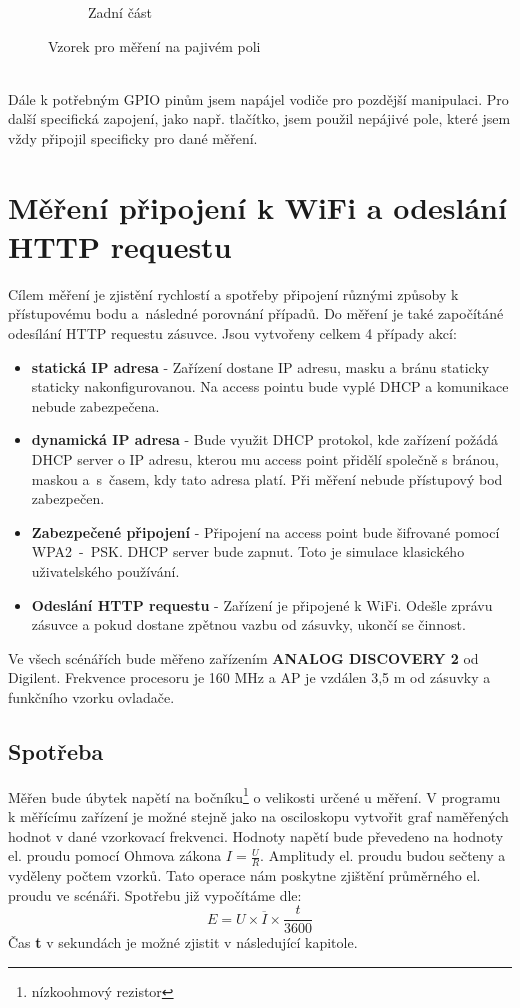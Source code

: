 \documentclass[a4paper, 12pt]{report}
\begin{document}
\begin{figure}[h!]
\begin{subfigure}[b]{0.4\linewidth}
            \caption{Zadní část}
        \end{subfigure}
        \caption{Vzorek pro měření na pajivém poli}
        \label{fig:zapojeni_esp32_vzorek}
    \end{figure}\\
    Dále k potřebným GPIO pinům jsem napájel vodiče pro pozdější manipulaci. Pro další specifická zapojení, jako např. tlačítko, jsem použil nepájivé pole, které jsem vždy připojil specificky pro dané měření.\\


    \section{Měření připojení k WiFi a odeslání HTTP requestu}
    \label{sec:wifi}
    Cílem měření je zjistění rychlostí a spotřeby připojení různými způsoby k přístupovému bodu a~následné porovnání případů. Do měření je také započítáné odesílání HTTP requestu zásuvce. Jsou vytvořeny celkem 4 případy akcí:
    \begin{itemize}
        \item \textbf{statická IP adresa} - Zařízení dostane IP adresu, masku a bránu staticky staticky nakonfigurovanou. Na access pointu bude vyplé DHCP a komunikace nebude zabezpečena.
        \item \textbf{dynamická IP adresa} - Bude využit DHCP protokol, kde zařízení požádá DHCP server o IP adresu, kterou mu access point přidělí společně s bránou, maskou a~s~časem, kdy tato adresa platí. Při měření nebude přístupový bod zabezpečen.
        \item \textbf{Zabezpečené připojení} - Připojení na access point bude šifrované pomocí WPA2~-~PSK. DHCP server bude zapnut. Toto je simulace klasického uživatelského používání.
        \item \textbf{Odeslání HTTP requestu} - Zařízení je připojené k WiFi. Odešle zprávu zásuvce a pokud dostane zpětnou vazbu od zásuvky, ukončí se činnost.
    \end{itemize}
    Ve všech scénářích bude měřeno zařízením \textbf{ANALOG DISCOVERY 2} od Digilent. Frekvence procesoru je 160 \si{MHz} a AP je vzdálen 3,5 \si{m} od zásuvky a funkčního vzorku ovladače.

    \subsection{Spotřeba}
    \label{subsec:wifi-spotreba}
    Měřen bude úbytek napětí na bočníku\footnote{nízkoohmový rezistor} o velikosti určené u měření. V programu k měřícímu zařízení je možné stejně jako na osciloskopu vytvořit graf naměřených hodnot v dané vzorkovací frekvenci. Hodnoty napětí bude převedeno na hodnoty el. proudu pomocí Ohmova zákona $I = \frac{U}{R}$. Amplitudy el. proudu budou sečteny a vyděleny počtem vzorků. Tato operace nám poskytne zjištění průměrného el. proudu ve scénáři. Spotřebu již vypočítáme dle:
    \[E = U \times \overline{I} \times \frac{t}{3600}\]
    Čas \textbf{t} v sekundách je možné zjistit v následující kapitole.
\end{document}
